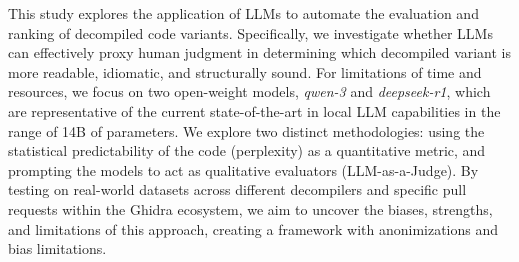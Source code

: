 This study explores the application of \acp{LLM} to automate the evaluation and ranking of decompiled code variants. Specifically, we investigate whether \acp{LLM} can effectively proxy human judgment in determining which decompiled variant is more readable, idiomatic, and structurally sound. 
For limitations of time and resources, we focus on two open-weight models, \emph{qwen-3} and \emph{deepseek-r1}, which are representative of the current state-of-the-art in local \ac{LLM} capabilities in the range of 14B of parameters.
We explore two distinct methodologies: using the statistical predictability of the code (perplexity) as a quantitative metric, and prompting the models to act as qualitative evaluators (LLM-as-a-Judge). 
By testing on real-world datasets across different decompilers and specific pull requests within the Ghidra ecosystem, we aim to uncover the biases, strengths, and limitations of this approach, creating a framework with anonimizations and bias limitations.